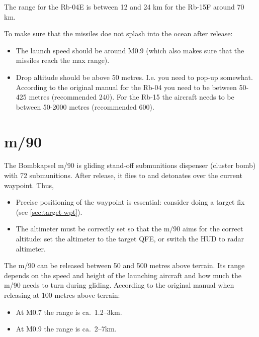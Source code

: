 The range for the Rb-04E is between 12 and 24 km \textasciimacron for the Rb-15F around 70 km.

To make sure that the missiles doe not splash into the ocean after release:
\begin{itemize}
  \item The launch speed should be around M0.9 (which also makes sure that the missiles reach the max range).
  \item Drop altitude should be above 50 metres. I.e. you need to pop-up somewhat. According to the original manual for the Rb-04 you need to be between 50-425 metres (recommended 240). For the Rb-15 the aircraft needs to be between 50-2000 metres (recommended 600).
\end{itemize}

\section{m/90}
The Bombkapsel m/90 is gliding stand-off submunitions dispenser (cluster bomb) with 72 submunitions.
After release, it flies to and detonates over the current waypoint.
Thus,
\begin{itemize}
  \item Precise positioning of the waypoint is essential:
    consider doing a target fix (see \cref{sec:target-wpt}).
  \item The altimeter must be correctly set so that the m/90 aims for the correct altitude:
    set the altimeter to the target QFE, or switch the HUD to radar altimeter.
\end{itemize}

The m/90 can be released between 50 and 500 metres above terrain.
Its range depends on the speed and height of the launching aircraft and how much the m/90 needs to turn during gliding.
According to the original manual when releasing at 100 metres above terrain:
\begin{itemize}[nosep]
  \item At M0.7 the range is ca.\ 1.2--3km.
  \item At M0.9 the range is ca.\ 2--7km.
\end{itemize}
